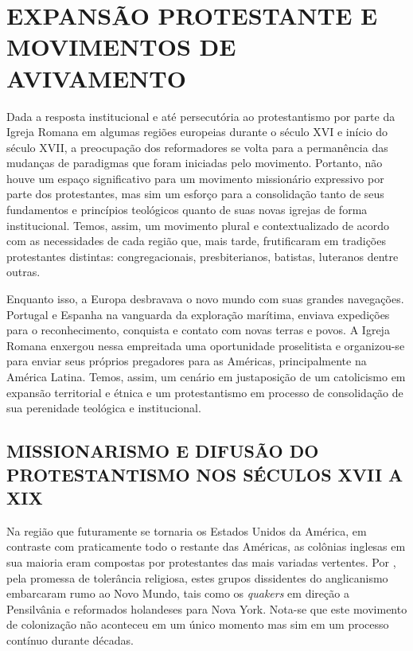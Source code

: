 \documentclass[
    article,            %
	12pt,				%
	oneside,			%
	a4paper,			%
	chapter=TITLE,		%
	section=TITLE,		%
	english,			%
	french,				%
	spanish,			%
	brazil				%
	]{abntex2}
\begin{document}
\section{EXPANSÃO PROTESTANTE E MOVIMENTOS DE AVIVAMENTO}
Dada a resposta institucional e até persecutória ao protestantismo por parte da Igreja Romana em algumas regiões europeias durante o século XVI e início do século XVII, a preocupação dos reformadores se volta para a permanência das mudanças de paradigmas que foram iniciadas pelo movimento. Portanto, não houve um espaço significativo para um movimento missionário expressivo por parte dos protestantes, mas sim um esforço para a consolidação tanto de seus fundamentos e princípios teológicos quanto de suas novas igrejas de forma institucional. Temos, assim, um movimento plural e contextualizado de acordo com as necessidades de cada região que, mais tarde, frutificaram em tradições protestantes distintas: congregacionais, presbiterianos, batistas, luteranos dentre outras.

Enquanto isso, a Europa desbravava o novo mundo com suas grandes navegações. Portugal e Espanha na vanguarda da exploração marítima, enviava expedições para o reconhecimento, conquista e contato com novas terras e povos. A Igreja Romana enxergou nessa empreitada uma oportunidade proselitista e organizou-se para enviar seus próprios pregadores para as Américas, principalmente na América Latina. Temos, assim, um cenário em justaposição de um catolicismo em expansão territorial e étnica e um protestantismo em processo de consolidação de sua perenidade teológica e institucional.

\subsection{MISSIONARISMO E DIFUSÃO DO PROTESTANTISMO NOS SÉCULOS XVII A XIX}
Na região que futuramente se tornaria os Estados Unidos da América, em contraste com praticamente todo o restante das Américas, as colônias inglesas em sua maioria eram compostas por protestantes das mais variadas vertentes. Por , pela promessa de tolerância religiosa, estes grupos dissidentes do anglicanismo embarcaram rumo ao Novo Mundo, tais como os \emph{quakers} em direção a Pensilvânia e reformados holandeses para Nova York. Nota-se que este movimento de colonização não aconteceu em um único momento mas sim em um processo contínuo durante décadas.
\end{document}
